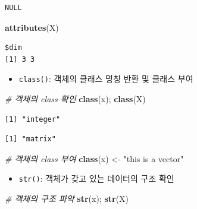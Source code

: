 \documentclass[
  11pt,
]{krantz}
\newenvironment{Shaded}{\begin{snugshade}}{\end{snugshade}}
\newcommand{\CommentTok}[1]{\textcolor[rgb]{0.37,0.37,0.37}{\textit{#1}}}
\newcommand{\KeywordTok}[1]{\textcolor[rgb]{0.27,0.27,0.27}{\textbf{#1}}}
\newcommand{\NormalTok}[1]{#1}
\newcommand{\StringTok}[1]{\textcolor[rgb]{0.5,0.5,0.5}{#1}}
\providecommand{\tightlist}{%
  \setlength{\itemsep}{0pt}\setlength{\parskip}{0pt}}
\begin{document}
\begin{verbatim}
NULL
\end{verbatim}

\begin{Shaded}
\begin{Highlighting}[]
\KeywordTok{attributes}\NormalTok{(X)}
\end{Highlighting}
\end{Shaded}

\begin{verbatim}
$dim
[1] 3 3
\end{verbatim}

\normalsize

\begin{itemize}
\tightlist
\item
  \texttt{class()}: 객체의 클래스 명칭 반환 및 클래스 부여
\end{itemize}

\footnotesize

\begin{Shaded}
\begin{Highlighting}[]
\CommentTok{# 객체의 class 확인}
\KeywordTok{class}\NormalTok{(x); }\KeywordTok{class}\NormalTok{(X)}
\end{Highlighting}
\end{Shaded}

\begin{verbatim}
[1] "integer"
\end{verbatim}

\begin{verbatim}
[1] "matrix"
\end{verbatim}

\begin{Shaded}
\begin{Highlighting}[]
\CommentTok{# 객체의 class 부여}
\KeywordTok{class}\NormalTok{(x) <-}\StringTok{ "this is a vector"}
\end{Highlighting}
\end{Shaded}

\normalsize

\begin{itemize}
\tightlist
\item
  \texttt{str()}: 객체가 갖고 있는 데이터의 구조 확인
\end{itemize}

\footnotesize

\begin{Shaded}
\begin{Highlighting}[]
\CommentTok{# 객체의 구조 파악}
\KeywordTok{str}\NormalTok{(x); }\KeywordTok{str}\NormalTok{(X)}
\end{Highlighting}
\end{Shaded}
\end{document}
